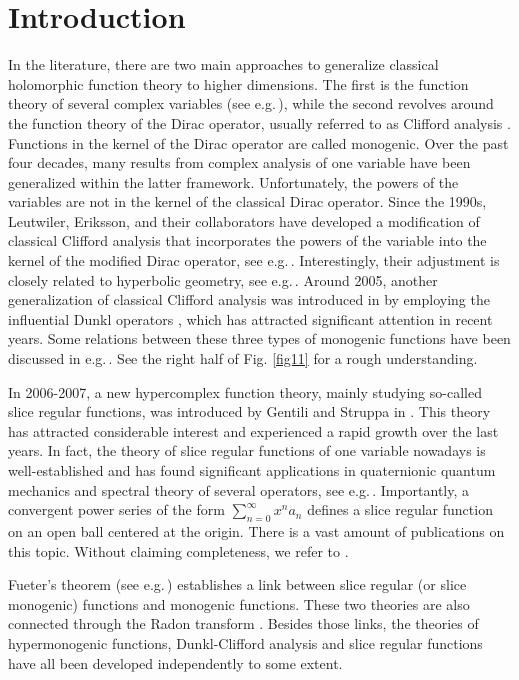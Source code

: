 \documentclass{amsart}
\theoremstyle{definition}
\theoremstyle{remark}
\numberwithin{equation}{section}
\begin{document}
\section{Introduction}
In the literature, there are two main approaches to generalize classical holomorphic function theory to higher dimensions. The first is the function theory of several complex variables (see e.g.\,\cite{kra}), while  the second revolves around the function theory of the Dirac operator,  usually referred to as Clifford analysis \cite{dss}. Functions in the kernel of the Dirac operator are called monogenic.  Over the past four decades, many results from complex analysis of one variable have been  generalized within the latter framework. %
Unfortunately, the powers of the variables are not in the kernel of the classical Dirac operator.  Since the 1990s,  Leutwiler, Eriksson, and their collaborators have developed a modification of classical Clifford analysis that incorporates the powers of the variable into the kernel of the modified Dirac operator, see e.g.\,\cite{leu1, leu2}.  Interestingly, their adjustment is closely related to  hyperbolic geometry, see e.g.\,\cite{eo}. Around 2005, another  generalization of classical Clifford analysis was introduced in \cite{ckr} by employing  the influential Dunkl operators \cite{dun}, which has attracted significant attention in recent years. Some relations between these three types of monogenic functions have been discussed in e.g.\,\cite{eo, gos, leu2}. See the right half of Fig. \ref{fig11} for a rough understanding.

In 2006-2007, a new hypercomplex function theory, mainly studying so-called slice regular functions, was introduced  by Gentili and Struppa in \cite{gs}. This theory has attracted considerable interest and experienced  a rapid growth over the last years. In fact,  the theory of  slice regular functions  of one variable nowadays is well-established  and has found significant  applications in quaternionic quantum mechanics and spectral theory of several operators, see e.g.\,\cite{css1}.  Importantly, a convergent power series of the form $\sum_{n=0}^{\infty}x^{n}a_{n}$ defines a slice regular function on an open ball centered at the origin.  There is a vast amount of publications on this topic. Without claiming completeness, we refer to \cite{css22, css, gs, gss}.

Fueter's theorem  (see e.g.\,\cite{css2, esv, fue, qian}) establishes a link between slice regular (or slice monogenic) functions and monogenic functions.  These two theories are also connected through the Radon transform \cite{clss}. Besides those links, the theories of hypermonogenic functions, Dunkl-Clifford analysis and slice regular functions have all been developed  independently to some extent.
\end{document}
